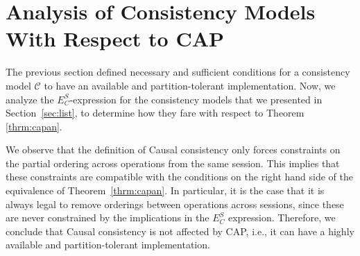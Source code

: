 \documentclass[journal, compsoc]{IEEEtran}
\begin{document}
	\section{Analysis of Consistency Models With Respect to CAP}\label{sec:capanalyze}
	
	The previous section defined necessary and sufficient conditions for
	a consistency model $\mathcal{C}$ to have an available and partition-tolerant
	implementation. Now, we analyze the $E^S_C$-expression for the consistency models that we presented in Section~\ref{sec:list}, to determine how they fare with respect to Theorem \ref{thrm:capan}.
	
	We observe that the definition of Causal consistency only forces constraints on the partial ordering across operations from the same session. This implies that these constraints are compatible with the conditions on the right hand side of the equivalence of Theorem~\ref{thrm:capan}. In particular, it is the case that it is always legal to remove orderings between operations across sessions, since these are never constrained by the implications in the $E^S_C$ expression. Therefore, we conclude that Causal consistency is not affected by CAP, i.e., it can have a highly available and partition-tolerant implementation.
	
\end{document}
